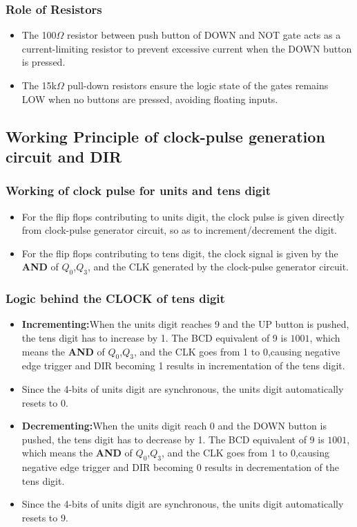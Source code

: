 \documentclass[a4paper,12pt]{article}
\begin{document}
\subsubsection{Role of Resistors}
\begin{itemize}
    \item The 100$\Omega$ resistor between push button of DOWN and NOT gate acts as a current-limiting resistor to prevent excessive current when the DOWN button is pressed.
    \item The 15k$\Omega$ pull-down resistors ensure the logic state of the gates remains LOW when no buttons are pressed, avoiding floating inputs.
\end{itemize}

\subsection{Working Principle of clock-pulse generation circuit and DIR}
\subsubsection{Working of clock pulse for units and tens digit}
\begin{itemize}
    \item For the flip flops contributing to units digit, the clock pulse is given directly from clock-pulse generator circuit, so as to increment/decrement the digit.
    \item For the flip flops contributing to tens digit, the clock signal is given by the \textbf{AND} of $Q_0$,$Q_3$, and the CLK generated by the clock-pulse generator circuit.
\end{itemize}

\subsubsection{Logic behind the CLOCK of tens digit}
\begin{itemize}
    \item \textbf{Incrementing:}When the units digit reaches 9 and the UP button is pushed, the tens digit has to increase by 1. The BCD equivalent of 9 is $1001$, which means the \textbf{AND} of $Q_0$,$Q_3$, and the CLK goes from 1 to 0,causing negative edge trigger and DIR becoming 1 results in incrementation of the tens digit.
    \item Since the 4-bits of units digit are synchronous, the units digit automatically resets to 0.
    \item \textbf{Decrementing:}When the units digit reach 0 and the DOWN button is pushed, the tens digit has to decrease by 1. The BCD equivalent of 9 is $1001$, which means the \textbf{AND} of $Q_0$,$Q_3$, and the CLK goes from 1 to 0,causing negative edge trigger and DIR becoming 0 results in decrementation of the tens digit.
    \item Since the 4-bits of units digit are synchronous, the units digit automatically resets to 9.
\end{itemize}
\end{document}
